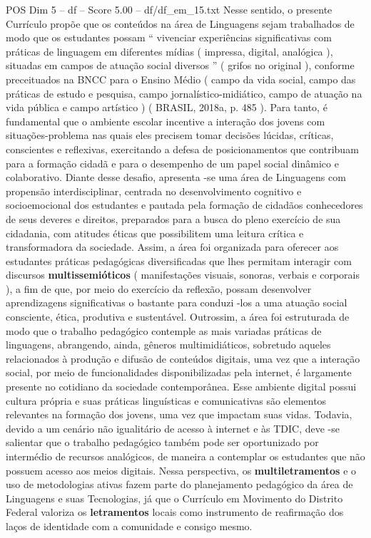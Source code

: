 \begin{textsample}{POS Dim 5 – df – Score 5.00 – df/df\_em\_15.txt}
Nesse sentido, o presente Currículo propõe que os conteúdos na área de Linguagens sejam trabalhados de modo que os estudantes possam “ vivenciar experiências significativas com práticas de linguagem em diferentes mídias ( impressa, digital, analógica ), situadas em campos de atuação social diversos ” ( grifos no original ), conforme preceituados na BNCC para o Ensino Médio ( campo da vida social, campo das práticas de estudo e pesquisa, campo jornalístico-midiático, campo de atuação na vida pública e campo artístico ) ( BRASIL, 2018a, p. 485 ).
Para tanto, é fundamental que o ambiente escolar incentive a interação dos jovens com situações-problema nas quais eles precisem tomar decisões lúcidas, críticas, conscientes e reflexivas, exercitando a defesa de posicionamentos que contribuam para a formação cidadã e para o desempenho de um papel social dinâmico e colaborativo.
Diante desse desafio, apresenta -se uma área de Linguagens com propensão interdisciplinar, centrada no desenvolvimento cognitivo e socioemocional dos estudantes e pautada pela formação de cidadãos conhecedores de seus deveres e direitos, preparados para a busca do pleno exercício de sua cidadania, com atitudes éticas que possibilitem uma leitura crítica e transformadora da sociedade.
Assim, a área foi organizada para oferecer aos estudantes práticas pedagógicas diversificadas que lhes permitam interagir com discursos \textbf{multissemióticos} ( manifestações visuais, sonoras, verbais e corporais ), a fim de que, por meio do exercício da reflexão, possam desenvolver aprendizagens significativas o bastante para conduzi -los a uma atuação social consciente, ética, produtiva e sustentável.
Outrossim, a área foi estruturada de modo que o trabalho pedagógico contemple as mais variadas práticas de linguagens, abrangendo, ainda, gêneros multimidiáticos, sobretudo aqueles relacionados à produção e difusão de conteúdos digitais, uma vez que a interação social, por meio de funcionalidades disponibilizadas pela internet, é largamente presente no cotidiano da sociedade contemporânea.
Esse ambiente digital possui cultura própria e suas práticas linguísticas e comunicativas são elementos relevantes na formação dos jovens, uma vez que impactam suas vidas.
Todavia, devido a um cenário não igualitário de acesso à internet e às TDIC, deve -se salientar que o trabalho pedagógico também pode ser oportunizado por intermédio de recursos analógicos, de maneira a contemplar os estudantes que não possuem acesso aos meios digitais.
Nessa perspectiva, os \textbf{multiletramentos} e o uso de metodologias ativas fazem parte do planejamento pedagógico da área de Linguagens e suas Tecnologias, já que o Currículo em Movimento do Distrito Federal valoriza os \textbf{letramentos} locais como instrumento de reafirmação dos laços de identidade com a comunidade e consigo mesmo.

\end{textsample}
